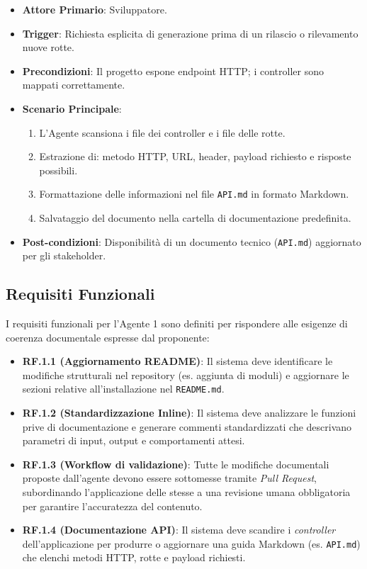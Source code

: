 \documentclass[12pt, a4paper]{article}
\begin{document}
\begin{itemize}
    \item \textbf{Attore Primario}: Sviluppatore.
    \item \textbf{Trigger}: Richiesta esplicita di generazione prima di un rilascio o rilevamento nuove rotte.
    \item \textbf{Precondizioni}: Il progetto espone endpoint HTTP; i controller sono mappati correttamente.
    \item \textbf{Scenario Principale}:
        \begin{enumerate}
            \item L'Agente scansiona i file dei controller e i file delle rotte.
            \item Estrazione di: metodo HTTP, URL, header, payload richiesto e risposte possibili.
            \item Formattazione delle informazioni nel file \texttt{API.md} in formato Markdown.
            \item Salvataggio del documento nella cartella di documentazione predefinita.
        \end{enumerate}
    \item \textbf{Post-condizioni}: Disponibilità di un documento tecnico (\texttt{API.md}) aggiornato per gli stakeholder.
\end{itemize}




\subsection{Requisiti Funzionali}

I requisiti funzionali per l'Agente 1 sono definiti per rispondere alle esigenze di coerenza documentale espresse dal proponente:



\begin{itemize}

    \item \textbf{RF.1.1 (Aggiornamento README)}: Il sistema deve identificare le modifiche strutturali nel repository (es. aggiunta di moduli) e aggiornare le sezioni relative all'installazione nel \texttt{README.md}.

    \item \textbf{RF.1.2 (Standardizzazione Inline)}: Il sistema deve analizzare le funzioni prive di documentazione e generare commenti standardizzati che descrivano parametri di input, output e comportamenti attesi.

    \item \textbf{RF.1.3 (Workflow di validazione)}: Tutte le modifiche documentali proposte dall'agente devono essere sottomesse tramite \textit{Pull Request}, subordinando l'applicazione delle stesse a una revisione umana obbligatoria per garantire l'accuratezza del contenuto.

    \item \textbf{RF.1.4 (Documentazione API)}: Il sistema deve scandire i \textit{controller} dell'applicazione per produrre o aggiornare una guida Markdown (es. \texttt{API.md}) che elenchi metodi HTTP, rotte e payload richiesti.

\end{itemize}
\end{document}
